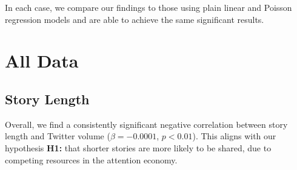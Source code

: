 In each case, we compare our findings to those using plain linear and Poisson regression models and are able to achieve the same significant results.  

\section{All Data}
\subsection{Story Length}
Overall, we find a consistently significant negative correlation between story length and Twitter volume ($\beta=-0.0001$, $p<0.01$). 
This aligns with our hypothesis \textbf{H1:} that shorter stories are more likely to be shared, due to competing resources in the attention economy.

